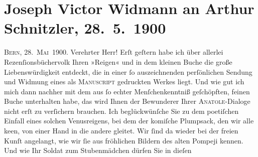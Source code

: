 

         \newcommand{\erwaehnteOrte}{Orte: Bern, Pompei, Wien}
         \newcommand{\erwaehnteWerke}{Werke: Anatol, Kunst und Litteratur, Reigen. Zehn Dialoge}
               \section[Joseph Victor Widmann an Arthur Schnitzler, 28. 5. 1900]{ Joseph Victor Widmann an Arthur Schnitzler, 28. 5. 1900}\nopagebreak{}\rehead{ }\begin{ledgroupsized}[t]{13cm}\normalsize\beginnumbering \toendnotes[C]{\smallbreak\pagebreak[2]} 
\toendnotes[C]{\smallbreak}\pstart
           \raggedleft{}{\pb}\textsc{Bern, 28. Mai 1900}.\pend
           \pstart{}Verehrter Herr!\pend\pstart
           Erſt geſtern habe ich über allerlei Rezenſionsbüchervolk Ihren »Reigen« und in dem kleinen Buche die große
                    Liebenswürdigkeit entdeckt, die in einer ſo auszeichnenden perſönlichen {\pb}Sendung und Widmung eines als \textsc{Manuscript} gedruckten Werkes liegt.\pend
           \pstart
           Und wie gut ich mich dann nachher mit dem aus ſo echter Menſchenkenntniß
                    geſchöpften, feinen Buche unterhalten habe, das wird Ihnen der Bewunderer Ihrer \textsc{Anatole}-Dialoge nicht erſt zu verſichern brauchen.\pend
           \pstart
           Ich beglückwünſche Sie zu dem poetiſchen Einfall eines solchen Venusreigens, bei
                    dem der komiſche Plumpsack, den wir alle ke{\geminationn}en, von
                    einer Hand in die andere gleitet. Wir ſind da wieder bei der freien Kunſt
                    angelangt, wie wir ſie aus fröhlichen Bildern des alten Pompeji kennen. Und wie Ihr Soldat zum Stubenmädchen dürfen Sie in dieſen

\end{ledgroupsized}
